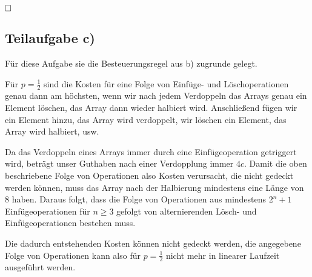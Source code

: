 \documentclass[12pt]{scrartcl}%
\theoremstyle{nonumberplain}
\begin{document}
$\hfill \square$

\subsection*{Teilaufgabe c)}

Für diese Aufgabe sie die Besteuerungsregel aus b) zugrunde gelegt.

Für $p = \frac{1}{2}$ sind die Kosten für eine Folge von Einfüge- und Löschoperationen genau dann am höchsten, wenn wir nach jedem Verdoppeln das Arrays genau ein Element löschen, das Array dann wieder halbiert wird. Anschließend fügen wir ein Element hinzu, das Array wird verdoppelt, wir löschen ein Element, das Array wird halbiert, usw.

Da das Verdoppeln eines Arrays immer durch eine Einfügeoperation getriggert wird, beträgt unser Guthaben nach einer Verdopplung immer $4c$. Damit die oben beschriebene Folge von Operationen also Kosten verursacht, die nicht gedeckt werden können, muss das Array nach der Halbierung mindestens eine Länge von 8 haben. Daraus folgt, dass die Folge von Operationen aus mindestens $2^n + 1$ Einfügeoperationen für $n \ge 3$ gefolgt von alternierenden Lösch- und Einfügeoperationen bestehen muss.

Die dadurch entstehenden Kosten können nicht gedeckt werden, die angegebene Folge von Operationen kann also für $p = \frac{1}{2}$ nicht mehr in linearer Laufzeit ausgeführt werden.
\end{document}
